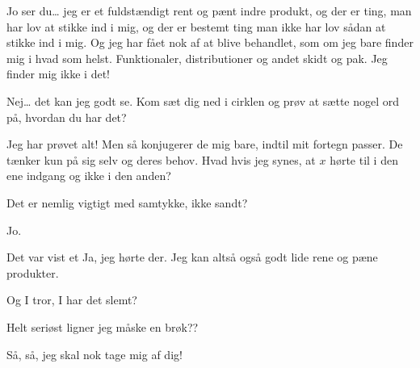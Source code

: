 \documentclass[a4paper,11pt]{article}
\begin{document}
\begin{sketch}
 Jo ser du… jeg er et fuldstændigt rent og pænt indre produkt, og der er ting, man har lov at stikke ind i mig, og der er bestemt ting man ikke har lov sådan at stikke ind i mig. Og jeg har fået nok af at blive behandlet, som om jeg bare finder mig i hvad som helst. Funktionaler, distributioner og andet skidt og pak. Jeg finder mig ikke i det!

 Nej… det kan jeg godt se. Kom sæt dig ned i cirklen og prøv at sætte nogel ord på, hvordan du har det?

 Jeg har prøvet alt! Men så konjugerer de mig bare, indtil mit fortegn passer. De tænker kun på sig selv og deres behov. Hvad hvis jeg synes, at $x$ hørte til i den ene indgang og ikke i den anden?

 Det er nemlig vigtigt med samtykke, ikke sandt?

  Jo.

 Det var vist et Ja, jeg hørte der. Jeg kan altså også godt lide rene og pæne produkter. 


 Og I tror, I har det slemt? 

 Helt seriøst ligner jeg måske en brøk?? 

 Så, så, jeg skal nok tage mig af dig! 


\end{sketch}
\end{document}
